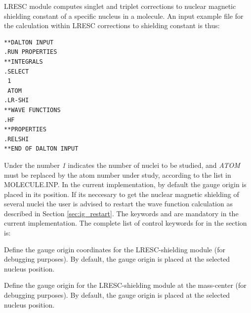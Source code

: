 \begin{center}
\end{center}

LRESC module computes singlet and triplet corrections to nuclear magnetic shielding constant of a specific nucleus in a molecule. An input example file for the calculation within LRESC corrections to shielding constant is thus:

\begin{verbatim}
**DALTON INPUT
.RUN PROPERTIES
**INTEGRALS
.SELECT
 1
 ATOM
.LR-SHI
**WAVE FUNCTIONS
.HF
**PROPERTIES
.RELSHI
**END OF DALTON INPUT
\end{verbatim}

Under  the number \textit{1} indicates the number of nuclei to be studied, and \textit{ATOM} must be replaced by the atom number under study, according to the list in MOLECULE.INP.
In the current implementation, by default the gauge origin is placed in its position. If its neccesary to get the nuclear magnetic shielding of several nuclei the user is advised to restart the wave function calculation as described in Section \ref{sec:ig_restart}. The keywords  and  are mandatory in the current implementation. The complete list of control keywords for  in the  section is:
\begin{list}{}{\itemsep 0.10cm \parsep 0.0cm}
\item[\Key{LRGAUGEO}] Define the gauge origin coordinates for the LRESC-shielding module (for debugging purposes). By default, the gauge origin is placed at the selected nucleus position.
\item[\Key{LRCMG}] Define the gauge origin for the LRESC-shielding module at the mass-center (for debugging purposes). By default, the gauge origin is placed at the selected nucleus position.
\end{list}

